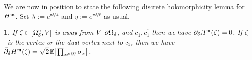 \documentclass[12pt,oneside,english]{amsart}
\numberwithin{equation}{section}
\numberwithin{figure}{section}
\theoremstyle{plain}
\theoremstyle{plain}
\theoremstyle{plain}
\theoremstyle{plain}
\newtheorem{lem}[thm]{\protect\lemmaname}
\theoremstyle{remark}
\theoremstyle{definition}
\theoremstyle{plain}
\theoremstyle{plain}
\numberwithin{thm}{section}
\newcommand{\kallemod}[1]{{\color{kallecol} {#1}}}
\providecommand{\lemmaname}{Lemma}
\providecommand{\lemmaname}{Lemma}
\providecommand{\lemmaname}{Lemma}
\providecommand{\lemmaname}{Lemma}
\begin{document}
We are now in position to state the following discrete holomorphicity
lemma for $H^{\mathfrak{m}}$.
Set $\lambda := e^{\pi \ii /4}$ and $\eta := e^{\pi \ii /8}$ as usual. 
\begin{lem}
\label{lem:corner-medial-disc-hol}
If $\zeta \in {\left[ {{\Omega}}_{{\delta}}^{\diamond}, V \right]}$ is away from
$V$, $\partial{{\Omega}}_{{\delta}} $, and $c_{1}, c_{1}^{*}$ then we have
${{\bar{\partial}}}_{{\delta}} H^{\mathfrak{m}} (\zeta) =0$.
If $\zeta$~is the vertex or the dual vertex next to $c_{1}$, then
we have ${{\bar{\partial}}}_{{\delta}}  H^{\mathfrak{m}} (\zeta) 
= \sqrt{2} \, \mathbb{E} \! \left[ { \prod_{x\in W} {\sigma}_{x} } \right] $.
\end{lem}
\end{document}
